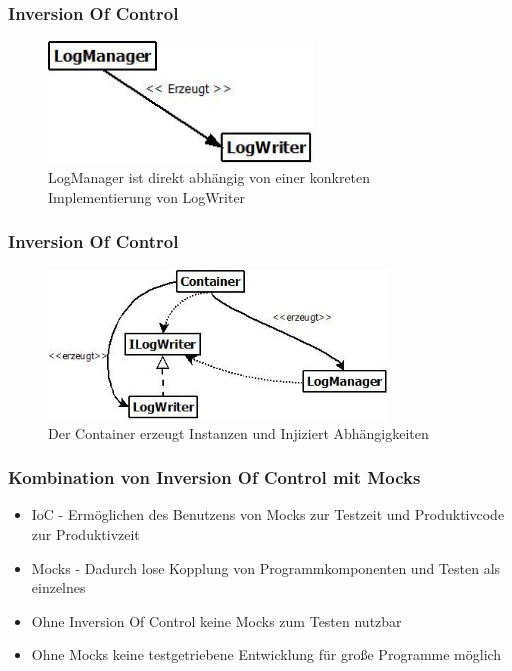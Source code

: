 \documentclass{beamer}
\begin{document}
\begin{frame}
\frametitle{Inversion Of Control}
\begin{figure}[htbp]
\includegraphics[width=7cm]{logging_closeCoupled.jpg}
\caption{LogManager ist direkt abhängig von einer konkreten Implementierung von LogWriter}
\end{figure}
\end{frame}

\begin{frame}
\frametitle{Inversion Of Control}
\begin{figure}[htbp]
\includegraphics[width=9cm]{logging_looseCoupled.jpg}
\caption{Der Container erzeugt Instanzen und Injiziert Abhängigkeiten}
\end{figure}
\end{frame}

\begin{frame}
\frametitle{Kombination von Inversion Of Control mit Mocks}
\begin{itemize}
\item IoC - Ermöglichen des Benutzens von Mocks zur Testzeit und Produktivcode zur Produktivzeit
\item Mocks - Dadurch lose Kopplung von Programmkomponenten und Testen als einzelnes\\
\item Ohne Inversion Of Control keine Mocks zum Testen nutzbar
\item Ohne Mocks keine testgetriebene Entwicklung für große Programme möglich
\end{itemize}
\end{frame}
\end{document}
